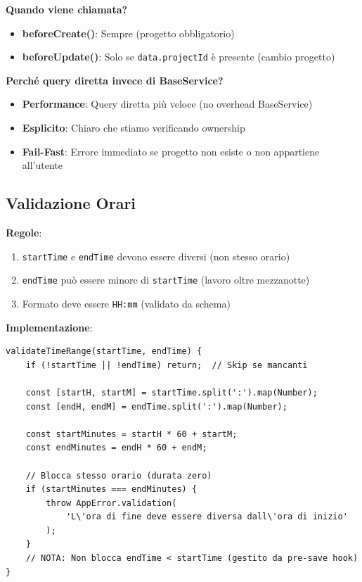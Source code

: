 \documentclass[11pt,a4paper]{article}
\begin{document}
\textbf{Quando viene chiamata?}
\begin{itemize}
    \item \textbf{beforeCreate()}: Sempre (progetto obbligatorio)
    \item \textbf{beforeUpdate()}: Solo se \texttt{data.projectId} è presente (cambio progetto)
\end{itemize}

\textbf{Perché query diretta invece di BaseService?}
\begin{itemize}
    \item \textbf{Performance}: Query diretta più veloce (no overhead BaseService)
    \item \textbf{Esplicito}: Chiaro che stiamo verificando ownership
    \item \textbf{Fail-Fast}: Errore immediato se progetto non esiste o non appartiene all'utente
\end{itemize}

\subsection{Validazione Orari}

\textbf{Regole}:
\begin{enumerate}
    \item \texttt{startTime} e \texttt{endTime} devono essere diversi (non stesso orario)
    \item \texttt{endTime} può essere minore di \texttt{startTime} (lavoro oltre mezzanotte)
    \item Formato deve essere \texttt{HH:mm} (validato da schema)
\end{enumerate}

\textbf{Implementazione}:
\begin{lstlisting}
validateTimeRange(startTime, endTime) {
    if (!startTime || !endTime) return;  // Skip se mancanti
    
    const [startH, startM] = startTime.split(':').map(Number);
    const [endH, endM] = endTime.split(':').map(Number);
    
    const startMinutes = startH * 60 + startM;
    const endMinutes = endH * 60 + endM;
    
    // Blocca stesso orario (durata zero)
    if (startMinutes === endMinutes) {
        throw AppError.validation(
            'L\'ora di fine deve essere diversa dall\'ora di inizio'
        );
    }
    // NOTA: Non blocca endTime < startTime (gestito da pre-save hook)
}
\end{lstlisting}
\end{document}
